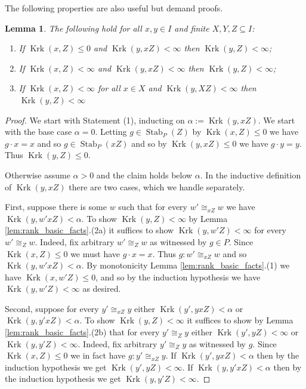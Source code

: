 \documentclass[12pt]{amsart}
\theoremstyle{plain}
\newtheorem{lemma}[theorem]{Lemma}
\theoremstyle{definition}
\newcommand{\isom}{\cong}
\DeclareMathOperator{\Stab}{Stab}
\DeclareMathOperator{\Krk}{Krk}
\begin{document}
The following properties are also useful but demand proofs.

\begin{lemma}\label{lem:clmin_closure}
The following hold for all $x, y \in I$ and finite $X, Y, Z \subseteq I$:
\begin{enumerate}
\item If $\Krk(x, Z) \le 0$ and $\Krk(y, xZ) < \infty$ then $\Krk(y, Z) < \infty$;
\item If $\Krk(x, Z) < \infty$ and $\Krk(y, xZ) < \infty$ then $\Krk(y, Z) < \infty$; 
\item If $\Krk(x, Z) < \infty$ for all $x \in X$ and $\Krk(y, XZ) < \infty$ then $\Krk(y, Z) < \infty$
\end{enumerate}
\end{lemma}

\begin{proof}
We start with Statement (1), inducting on $\alpha := \Krk(y, xZ)$.
We start with the base case $\alpha = 0$.
Letting $g \in \Stab_P(Z)$ by $\Krk(x, Z) \le 0$ we have $g \cdot x = x$ and so $g \in \Stab_P(xZ)$ and so by $\Krk(y, xZ) \le 0$ we have $g \cdot y = y$. 
Thus $\Krk(y, Z) \le 0$.

Otherwise assume $\alpha > 0$ and the claim holds below $\alpha$.
In the inductive definition of $\Krk(y, xZ)$ there are two cases, which we handle separately.

First, suppose there is some $w$ such that for every $w' \isom_{xZ} w$ we have $\Krk(y, w'xZ) < \alpha$.
To show $\Krk(y, Z) < \infty$ by Lemma \ref{lem:rank_basic_facts}.(2a) it suffices to show $\Krk(y, w'Z) < \infty$ for every $w' \isom_Z w$.
Indeed, fix arbitrary $w' \isom_{Z} w$ as witnessed by $g \in P$.
Since $\Krk(x, Z) \le 0$ we must have $g \cdot x = x$.
Thus $g : w' \isom_{xZ} w$ and so $\Krk(y, w'xZ) < \alpha$.
By monotonicity Lemma \ref{lem:rank_basic_facts}.(1) we have $\Krk(x, w'Z) \le 0$, and so by the induction hypothesis we have $\Krk(y, w'Z) < \infty$ as desired.

Second, suppose for every $y' \isom_{xZ} y$ either $\Krk(y', yxZ) < \alpha$ or $\Krk(y, y'xZ) < \alpha$.
To show $\Krk(y, Z) < \infty$ it suffices to show by Lemma \ref{lem:rank_basic_facts}.(2b) that for every $y' \isom_Z y$ either $\Krk(y', yZ) < \infty$ or $\Krk(y, y'Z) < \infty$.
Indeed, fix arbitrary $y' \isom_Z y$ as witnessed by $g$.
Since $\Krk(x, Z) \le 0$ we in fact have $g : y' \isom_{xZ} y$.
If $\Krk(y', yxZ) < \alpha$ then by the induction hypothesis we get $\Krk(y', yZ) < \infty$.
If $\Krk(y, y'xZ) < \alpha$ then by the induction hypothesis we get $\Krk(y, y'Z) < \infty$.


\end{proof}
\end{document}
